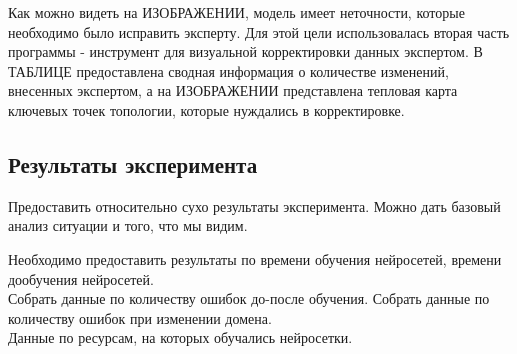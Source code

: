 Как можно видеть на ИЗОБРАЖЕНИИ, модель имеет неточности, которые необходимо было исправить эксперту. Для этой цели использовалась вторая часть программы - инструмент для визуальной корректировки данных экспертом. В ТАБЛИЦЕ  предоставлена сводная информация о количестве изменений, внесенных экспертом, а на ИЗОБРАЖЕНИИ представлена тепловая карта ключевых точек топологии, которые нуждались в корректировке. 



\subsection{Результаты эксперимента}

Предоставить относительно сухо результаты эксперимента. Можно дать базовый анализ ситуации и того, что мы видим.

Необходимо предоставить результаты по времени обучения нейросетей, времени дообучения нейросетей. \\ 
Собрать данные по количеству ошибок до-после обучения. Собрать данные по количеству ошибок при изменении домена. \\ 
Данные по ресурсам, на которых обучались нейросетки.


\newpage